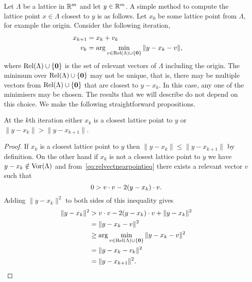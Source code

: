 \documentclass[final,leqno]{siamltex}
\begin{document}
Let $\Lambda$ be a lattice in ${\mathbb R}^m$ and let $y \in {\mathbb R}^m$. A simple method to compute the lattice point $x \in \Lambda$ closest to $y$ is as follows.  Let $x_0$ be some lattice point from $\Lambda$, for example the origin.  Consider the following iteration,
\begin{align}\
x_{k+1} &= x_k + v_k \nonumber \\
v_k &= \arg\min_{ v \in \relevant(\Lambda) \cup \{\zerobf\} } \|y - x_k - v \|, \label{eq:relvectsminimslicer}
\end{align} 
where $\operatorname{Rel}(\Lambda) \cup \{\boldsymbol{0}\}$ is the set of relevant vectors of $\Lambda$ including the origin.  The minimum over $\operatorname{Rel}(\Lambda) \cup \{\boldsymbol{0}\}$ may not be unique, that is, there may be multiple vectors from $\operatorname{Rel}(\Lambda) \cup \{\boldsymbol{0}\}$ that are closest to $y - x_k$.  In this case, any one of the minimisers may be chosen.  The results that we will describe do not depend on this choice. We make the following straightforward propositions.

\begin{proposition}\label{obs:1}
At the $k$th iteration either $x_k$ is a closest lattice point to $y$ or $\|y - x_k\| > \| y - x_{k+1} \|$.
\end{proposition}
\begin{proof}
If $x_k$ is a closest lattice point to $y$ then $\|y - x_k\| \leq \| y - x_{k+1} \|$ by definition.  On the other hand if $x_k$ is not a closest lattice point to $y$ we have $y - x_k \notin \operatorname{Vor}(\Lambda)$ and from~\eqref{eq:relvectnearpointieq} there exists a relevant vector $v$ such that
\[
0 > v \cdot v - 2(y - x_k) \cdot v.
\]
Adding $\|y - x_k\|^2$ to both sides of this inequality gives
\begin{align*}
\|y - x_k\|^2 &> v \cdot v - 2(y - x_k) \cdot v + \|y - x_k\|^2 \\
&= \|y - x_k - v\|^2 \\
&\geq \arg\min_{ v \in \operatorname{Rel}(\Lambda) \cup \{\boldsymbol{0}\}}\|y - x_k - v \|^2 \\
&= \|y - x_k - v_k \|^2 \\
&= \|y - x_{k+1}\|^2. 
\end{align*}
\end{proof} 
\end{document}
